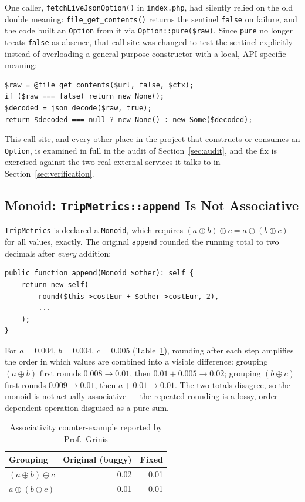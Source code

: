 \documentclass[a4paper,12pt,fleqn]{article}
\begin{document}
One caller, \texttt{fetchLiveJsonOption()} in \texttt{index.php}, had silently relied on the old double meaning: \texttt{file\_get\_contents()} returns the sentinel \texttt{false} on failure, and the code built an \texttt{Option} from it via \texttt{Option::pure(\$raw)}. Since \texttt{pure} no longer treats \texttt{false} as absence, that call site was changed to test the sentinel explicitly instead of overloading a general-purpose constructor with a local, API-specific meaning:
\begin{lstlisting}[caption={index.php -- explicit sentinel check instead of overloaded pure()}]
$raw = @file_get_contents($url, false, $ctx);
if ($raw === false) return new None();
$decoded = json_decode($raw, true);
return $decoded === null ? new None() : new Some($decoded);
\end{lstlisting}
This call site, and every other place in the project that constructs or consumes an \texttt{Option}, is examined in full in the audit of Section~\ref{sec:audit}, and the fix is exercised against the two real external services it talks to in Section~\ref{sec:verification}.

\subsection{Monoid: \texttt{TripMetrics::append} Is Not Associative}\label{sec:bug2}

\texttt{TripMetrics} is declared a \texttt{Monoid}, which requires $(a\oplus b)\oplus c = a \oplus (b\oplus c)$ for all values, exactly. The original \texttt{append} rounded the running total to two decimals after \emph{every} addition:
\begin{lstlisting}[caption={Original \texttt{TripMetrics::append}}]
public function append(Monoid $other): self {
    return new self(
        round($this->costEur + $other->costEur, 2),
        ...
    );
}
\end{lstlisting}

For $a=0.004,\,b=0.004,\,c=0.005$ (Table~\ref{tabl:monoid}), rounding after each step amplifies the order in which values are combined into a visible difference: grouping $(a\oplus b)$ first rounds $0.008\to 0.01$, then $0.01+0.005\to 0.02$; grouping $(b\oplus c)$ first rounds $0.009\to 0.01$, then $a+0.01\to 0.01$. The two totals disagree, so the monoid is not actually associative — the repeated rounding is a lossy, order-dependent operation disguised as a pure sum.

\begin{table}[!ht]\centering
\caption{Associativity counter-example reported by Prof.~Grinis}
\label{tabl:monoid}
\begin{tabular}{|l|r|r|}\hline
Grouping & Original (buggy) & Fixed \\\hline
$(a\oplus b)\oplus c$ & 0.02 & 0.01 \\\hline
$a\oplus (b\oplus c)$ & 0.01 & 0.01 \\\hline
\end{tabular}
\end{table}
\end{document}
